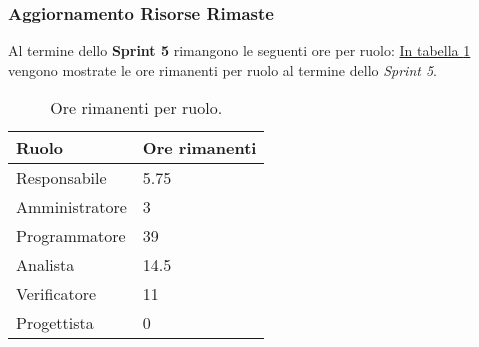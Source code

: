 \subsubsection{Aggiornamento Risorse Rimaste}
\label{sec:AggiornamentoRisorse_Sprint5}
Al termine dello \textbf{Sprint 5} rimangono le seguenti ore per ruolo: \hyperref[tab:sprint5_ore_rimanenti]{In tabella \ref{tab:sprint5_ore_rimanenti}} vengono mostrate le ore rimanenti per ruolo al termine dello \textit{Sprint 5}.

\begin{table}[H]
    \centering
    \begin{tabular}{| l | l |}
    \hline
    \textbf{Ruolo} & 
    \textbf{Ore rimanenti}\\
    \hline
        Responsabile & 5.75\\
    \hline
        Amministratore & 3\\
    \hline
        Programmatore & 39\\
    \hline
        Analista & 14.5\\
    \hline
        Verificatore & 11\\
    \hline
        Progettista & 0\\
    \hline
    \end{tabular}
    \caption{Ore rimanenti per ruolo.}
    \label{tab:sprint5_ore_rimanenti} 
\end{table}